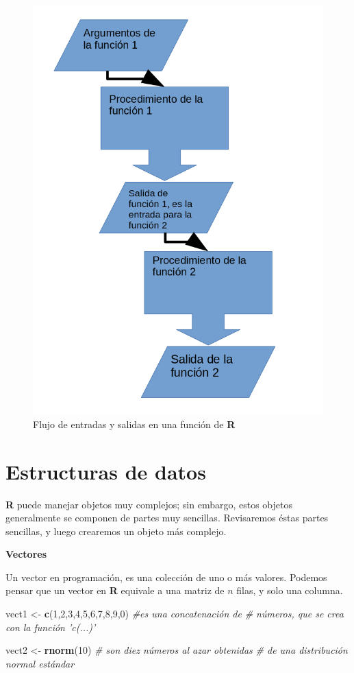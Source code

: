 \documentclass[12pt,letterpaper,]{book}
\newenvironment{Shaded}{\begin{snugshade}}{\end{snugshade}}
\newcommand{\KeywordTok}[1]{\textcolor[rgb]{0.13,0.29,0.53}{\textbf{#1}}}
\newcommand{\DecValTok}[1]{\textcolor[rgb]{0.00,0.00,0.81}{#1}}
\newcommand{\StringTok}[1]{\textcolor[rgb]{0.31,0.60,0.02}{#1}}
\newcommand{\CommentTok}[1]{\textcolor[rgb]{0.56,0.35,0.01}{\textit{#1}}}
\newcommand{\NormalTok}[1]{#1}
\begin{document}
\begin{figure}[thb!]

{\centering \includegraphics[width=0.4\linewidth]{figuras/RFunctionsFlow} 

}

\caption{Flujo de entradas y salidas en una función de \textbf{R}}\label{fig:RFunctionFlow}
\end{figure}

\section{Estructuras de datos}\label{estructuras-de-datos}

\textbf{R} puede manejar objetos muy complejos; sin embargo, estos
objetos generalmente se componen de partes muy sencillas. Revisaremos
éstas partes sencillas, y luego crearemos un objeto más complejo.

\textbf{Vectores}

Un vector en programación, es una colección de uno o más valores.
Podemos pensar que un vector en \textbf{R} equivale a una matriz de
\(n\) filas, y solo una columna.

\begin{Shaded}
\begin{Highlighting}[]
\NormalTok{vect1 <-}\StringTok{ }\KeywordTok{c}\NormalTok{(}\DecValTok{1}\NormalTok{,}\DecValTok{2}\NormalTok{,}\DecValTok{3}\NormalTok{,}\DecValTok{4}\NormalTok{,}\DecValTok{5}\NormalTok{,}\DecValTok{6}\NormalTok{,}\DecValTok{7}\NormalTok{,}\DecValTok{8}\NormalTok{,}\DecValTok{9}\NormalTok{,}\DecValTok{0}\NormalTok{) }\CommentTok{#es una concatenación de}
\CommentTok{# números, que se crea con la función 'c(...)'}

\NormalTok{vect2 <-}\StringTok{ }\KeywordTok{rnorm}\NormalTok{(}\DecValTok{10}\NormalTok{) }\CommentTok{# son diez números al azar obtenidas}
\CommentTok{# de una distribución normal estándar}
\end{Highlighting}
\end{Shaded}
\end{document}
